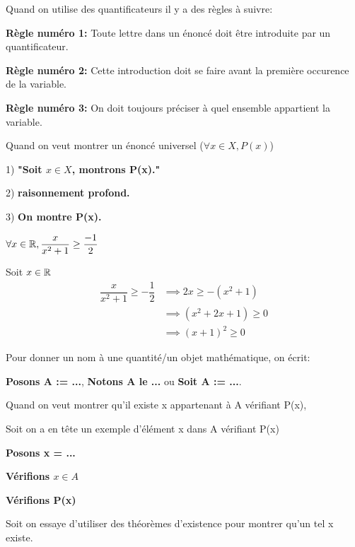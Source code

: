 \documentclass[a4paper, 12pt]{article}
\begin{document}
Quand on utilise des quantificateurs il y a des règles à suivre:

\textbf{Règle numéro 1:} Toute lettre dans un énoncé doit être introduite par un quantificateur.

\textbf{Règle numéro 2:} Cette introduction doit se faire avant la première occurence de la variable.

\textbf{Règle numéro 3:} On doit toujours préciser à quel ensemble appartient la variable.


\begin{methode}
    Quand on veut montrer un énoncé universel ($\forall x \in X, P(x)$)

    \vspace{0.5em}

    \item 1) \textbf{"Soit $x \in X$, montrons P(x)."}
    \item 2) \textbf{raisonnement profond.}
    \item 3) \textbf{On montre P(x).}
\end{methode}

\begin{example}
    $\forall x \in \mathbb{R}, \dfrac{x}{x^2 + 1} \geq \dfrac{-1}{2}$

    \vspace{1em}

    Soit $x \in \mathbb{R}$
    \begin{align*}
        \dfrac{x}{x^2 + 1} \geq -\dfrac{1}{2} &\implies 2x \geq -(x^2 + 1) \\
        &\implies (x^2 + 2x + 1) \geq 0\\
        &\implies (x + 1)^2 \geq 0
    \end{align*}
\end{example}

Pour donner un nom à une quantité/un objet mathématique, on écrit:

\textbf{Posons A := ...}, \textbf{Notons A le ...} ou \textbf{Soit A := ...}.

\begin{methode}
    Quand on veut montrer qu'il existe x appartenant à A vérifiant P(x),

    Soit on a en tête un exemple d'élément x dans A vérifiant P(x)
    \item \textbf{Posons x = ...}
    \item \textbf{Vérifions $x \in A$}
    \item \textbf{Vérifions P(x)}
    
    Soit on essaye d'utiliser des théorèmes d'existence pour montrer qu'un tel x existe.
\end{methode}
\end{document}

